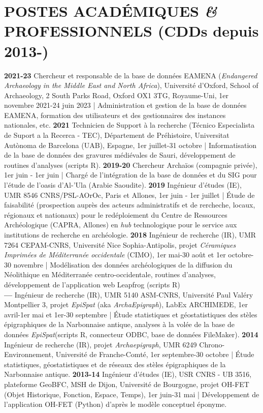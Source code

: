 \documentclass{article}
\begin{document}
\section{POSTES ACADÉMIQUES \textit{\&} PROFESSIONNELS (CDDs depuis 2013-)}

\textbf{2021-23} Chercheur et responsable de la base de données EAMENA (\textit{Endangered Archaeology in the Middle East and North Africa}), Université d'Oxford, School of Archaeology, 2 South Parks Road, Oxford OX1 3TG, Royaume-Uni, 1er novembre 2021-24 juin 2023 | Administration et gestion de la base de données EAMENA, formation des utilisateurs et des gestionnaires des instances nationales, etc.
\smallbreak
\textbf{2021} Technicien de Support à la recherche (Técnico Especialista de Suport a la Recerca - TEC), Département de Préhistoire, Universitat Autònoma de Barcelona (UAB), Espagne, 1er juillet-31 octobre | Informatisation de la base de données des gravures médiévales de Sauri, développement de routines d'analyses (scripts R).
\smallbreak
\textbf{2019-20} Chercheur Archaïos (compagnie privée), 1er juin - 1er juin | Chargé de l'intégration de la base de données et du SIG pour l'étude de l'oasis d'Al-'Ula (Arabie Saoudite).
\smallbreak
\textbf{2019} Ingénieur d'études (IE), UMR 8546 CNRS/PSL-AOrOc, Paris et Allones, 1er juin - 1er juillet | Étude de faisabilité (prospection auprès des acteurs administratifs et de rercheche, locaux, régionaux et nationaux) pour le redéploiement du Centre de Ressources Archéologique (CAPRA, Allones) en \textit{hub} technologique pour le service aux institutions de recherche en archéologie. 
\smallbreak
\textbf{2018} Ingénieur de recherche (IR), UMR 7264 CEPAM-CNRS, Université Nice Sophia-Antipolis, projet \textit{Céramiques Imprimées de Méditerranée occidentale} (CIMO), 1er mai-30 août et 1er octobre-30 novembre | Modélisation des données archéologiques de la diffusion du Néolithique en Méditerranée centro-occidentale, routines d'analyses, développement de l'application web Leapfrog (scripts R) \\
\textbf{---} Ingénieur de recherche (IR), UMR 5140 ASM-CNRS, Université Paul Valéry Montpellier 3, projet \textit{EpiSpat} (aka \textit{ArchaEpigraph}), LabEx ARCHIMEDE, 1er avril-1er mai et 1er-30 septembre | Étude statistiques et géostatistiques des stèles épigraphiques de la Narbonnaise antique, analyses à la volée de la base de données \textit{EpiSpat}(scripts R, connecteur ODBC, base de données FileMaker).
\smallbreak
\textbf{2014} Ingénieur de recherche (IR), projet \textit{Archaepigraph}, UMR 6249 Chrono-Environnement, Université de Franche-Comté, 1er septembre-30 octobre | Étude statistiques, géostatistiques et de réseaux des stèles épigraphiques de la Narbonnaise antique.
\smallbreak
\textbf{2013-14} Ingénieur d'études (IE), USR CNRS - UB 3516, plateforme GeoBFC, MSH de Dijon, Université de Bourgogne, projet OH-FET (Objet Historique, Fonction, Espace, Temps), 1er juin-31 mai | Développement de l'application OH-FET (Python) d'après le modèle conceptuel éponyme.
\end{document}
